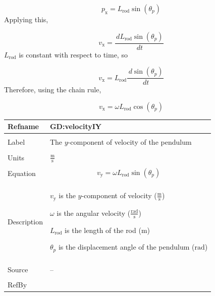 \documentclass[12pt]{article}
\begin{document}
\begin{displaymath}
{p_{\text{x}}}={L_{\text{rod}}} \sin\left({θ_{p}}\right)
\end{displaymath}
Applying this,

\begin{displaymath}
{v_{\text{x}}}=\frac{\,d{L_{\text{rod}}} \sin\left({θ_{p}}\right)}{\,dt}
\end{displaymath}
${L_{\text{rod}}}$ is constant with respect to time, so

\begin{displaymath}
{v_{\text{x}}}={L_{\text{rod}}} \frac{\,d\sin\left({θ_{p}}\right)}{\,dt}
\end{displaymath}
Therefore, using the chain rule,

\begin{displaymath}
{v_{\text{x}}}=ω {L_{\text{rod}}} \cos\left({θ_{p}}\right)
\end{displaymath}
\vspace{\baselineskip}
\noindent
\begin{minipage}{\textwidth}
\begin{tabular}{>{\raggedright}p{}>{\raggedright\arraybackslash}p{}}
\toprule \textbf{Refname} & \textbf{GD:velocityIY}
\label{GD:velocityIY}
\\ \midrule \\
Label & The $y$-component of velocity of the pendulum
        
\\ \midrule \\
Units & $\frac{\text{m}}{\text{s}}$
        
\\ \midrule \\
Equation & \begin{displaymath}
           {v_{\text{y}}}=ω {L_{\text{rod}}} \sin\left({θ_{p}}\right)
           \end{displaymath}
\\ \midrule \\
Description & \begin{symbDescription}
              \item{${v_{\text{y}}}$ is the $y$-component of velocity ($\frac{\text{m}}{\text{s}}$)}
              \item{$ω$ is the angular velocity ($\frac{\text{rad}}{\text{s}}$)}
              \item{${L_{\text{rod}}}$ is the length of the rod (${\text{m}}$)}
              \item{${θ_{p}}$ is the displacement angle of the pendulum (${\text{rad}}$)}
              \end{symbDescription}
\\ \midrule \\
Source & --
         
\\ \midrule \\
RefBy & 
\\ \bottomrule
\end{tabular}
\end{minipage}
\end{document}
